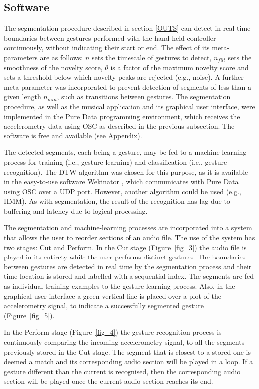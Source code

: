 \documentclass{nime-alternate_ADJ} %
\begin{document}
\subsection{Software}

The segmentation procedure described in section \ref{OUTS} can detect in real-time boundaries between gestures performed with the hand-held controller continuously, without indicating their start or end.  The effect of its meta-parameters are as follows: $n$  sets the timescale of gestures to detect, $n_{filt}$ sets the smoothness of the novelty score, $\theta$ is a factor of the maximum novelty score and sets a threshold below which novelty peaks are rejected (e.g., noise). A further meta-parameter was incorporated to prevent detection of segments of less than a given length $n_{min}$, such as transitions between gestures. The segmentation procedure, as well as  the musical application and its graphical user interface, were implemented in the Pure Data programming environment, which receives the accelerometry data using OSC as described in the previous subsection. The software is free and available (see Appendix).  

The detected segments, each being a gesture, may be fed to a machine-learning process for training (i.e., gesture learning) and classification (i.e., gesture recognition). The DTW algorithm was chosen for this purpose, as it is available in the easy-to-use software Wekinator \cite{Fiebrink_etal_2009, Wekinator_website}, which communicates with Pure Data using OSC over a UDP port. However, another algorithm could be used (e.g., HMM). As with segmentation, the result of the recognition has lag due to buffering and latency due to logical processing.

The segmentation and machine-learning processes are incorporated into a system that allows the user to reorder sections of an audio file. The use of the system has two stages: Cut and Perform. In the Cut stage (Figure~\ref{fig_3}) the audio file is played in its entirety while the user performs distinct gestures. The boundaries between gestures are detected in real time by the segmentation process and their time location is stored and labelled with a sequential index. The segments are fed as individual training examples to the gesture learning process. Also, in the graphical user interface a green vertical line is placed over a plot of the accelerometry signal, to indicate a successfully segmented gesture (Figure~\ref{fig_5}).

In the Perform stage (Figure~\ref{fig_4}) the gesture recognition process is continuously comparing the incoming accelerometry signal, to all the segments previously stored in the Cut stage. The segment that is closest to a stored one is deemed a match and its corresponding audio section will be played in a loop. If a gesture different than the current is recognised, then the corresponding audio section will be played once the current audio section reaches its end.
\end{document}
